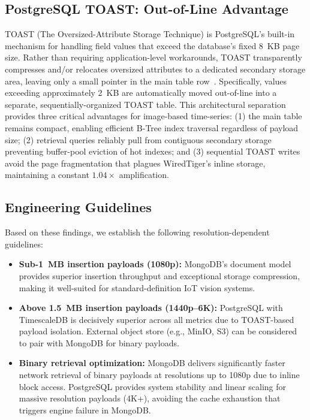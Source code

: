 \documentclass[conference]{IEEEtran}
\begin{document}
\subsection{PostgreSQL TOAST: Out-of-Line Advantage}
TOAST (The Oversized-Attribute Storage Technique) is PostgreSQL's built-in mechanism for handling field values that exceed the database's fixed 8~KB page size. Rather than requiring application-level workarounds, TOAST transparently compresses and/or relocates oversized attributes to a dedicated secondary storage area, leaving only a small pointer in the main table row~\cite{postgresql_toast_docs}. Specifically, values exceeding approximately 2~KB are automatically moved out-of-line into a separate, sequentially-organized TOAST table. This architectural separation provides three critical advantages for image-based time-series: (1) the main table remains compact, enabling efficient B-Tree index traversal regardless of payload size; (2) retrieval queries reliably pull from contiguous secondary storage preventing buffer-pool eviction of hot indexes; and (3) sequential TOAST writes avoid the page fragmentation that plagues WiredTiger's inline storage, maintaining a constant $1.04\times$ amplification.

\subsection{Engineering Guidelines}
Based on these findings, we establish the following resolution-dependent guidelines:
\begin{itemize}
    \item \textbf{Sub-1~MB insertion payloads (1080p):} MongoDB's document model provides superior insertion throughput and exceptional storage compression, making it well-suited for standard-definition IoT vision systems.
    \item \textbf{Above 1.5~MB insertion payloads (1440p--6K):} PostgreSQL with TimescaleDB is decisively superior across all metrics due to TOAST-based payload isolation. External object store (e.g., MinIO, S3) can be considered to pair with MongoDB for binary payloads.
    \item \textbf{Binary retrieval optimization:} MongoDB delivers significantly faster network retrieval of binary payloads at resolutions up to 1080p due to inline block access. PostgreSQL provides system stability and linear scaling for massive resolution payloads (4K+), avoiding the cache exhaustion that triggers engine failure in MongoDB.
\end{itemize}
\end{document}
